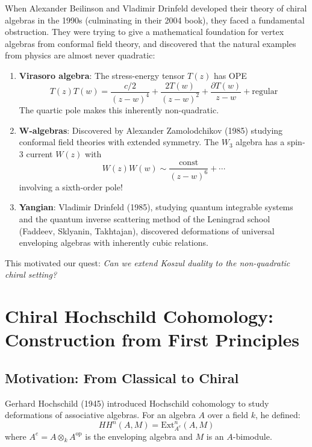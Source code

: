 When Alexander Beilinson and Vladimir Drinfeld developed their theory of chiral algebras in the 1990s (culminating in their 2004 book), they faced a fundamental obstruction. They were trying to give a mathematical foundation for vertex algebras from conformal field theory, and discovered that the natural examples from physics are almost never quadratic:

\begin{example}
\begin{enumerate}
\item \textbf{Virasoro algebra}: The stress-energy tensor $T(z)$ has OPE
\[
T(z)T(w) = \frac{c/2}{(z-w)^4} + \frac{2T(w)}{(z-w)^2} + \frac{\partial T(w)}{z-w} + \text{regular}
\]
The quartic pole makes this inherently non-quadratic.

\item \textbf{W-algebras}: Discovered by Alexander Zamolodchikov (1985) studying conformal field theories with extended symmetry. The $W_3$ algebra has a spin-3 current $W(z)$ with
\[
W(z)W(w) \sim \frac{\text{const}}{(z-w)^6} + \cdots
\]
involving a sixth-order pole!

\item \textbf{Yangian}: Vladimir Drinfeld (1985), studying quantum integrable systems and the quantum inverse scattering method of the Leningrad school (Faddeev, Sklyanin, Takhtajan), discovered deformations of universal enveloping algebras with inherently cubic relations.
\end{enumerate}
\end{example}

This motivated our quest: \emph{Can we extend Koszul duality to the non-quadratic chiral setting?}


\section{Chiral Hochschild Cohomology: Construction from First Principles}

\subsection{Motivation: From Classical to Chiral}

Gerhard Hochschild (1945) introduced Hochschild cohomology to study deformations of associative algebras. For an algebra $A$ over a field $k$, he defined:
\[
HH^n(A, M) = \text{Ext}^n_{A^e}(A, M)
\]
where $A^e = A \otimes_k A^{\text{op}}$ is the enveloping algebra and $M$ is an $A$-bimodule.

